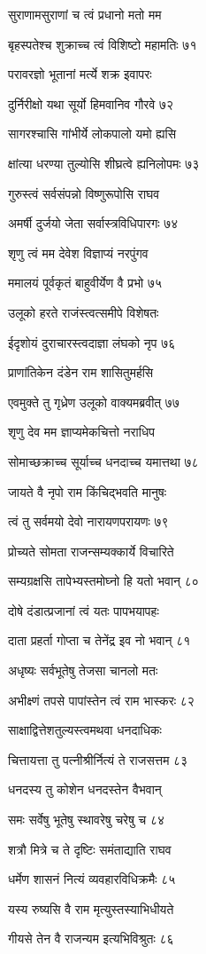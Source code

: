 सुराणामसुराणां च त्वं प्रधानो मतो मम

बृहस्पतेश्च शुक्राच्च त्वं विशिष्टो महामतिः ७१

परावरज्ञो भूतानां मर्त्ये शक्र इवापरः

दुर्निरीक्षो यथा सूर्यो हिमवानिव गौरवे ७२

सागरश्चासि गांभीर्ये लोकपालो यमो ह्यसि

क्षांत्या धरण्या तुल्योसि शीघ्रत्वे ह्यनिलोपमः ७३

गुरुस्त्वं सर्वसंपन्नो विष्णुरूपोसि राघव

अमर्षी दुर्जयो जेता सर्वास्त्रविधिपारगः ७४

शृणु त्वं मम देवेश विज्ञाप्यं नरपुंगव

ममालयं पूर्वकृतं बाहुवीर्येण वै प्रभो ७५

उलूको हरते राजंस्त्वत्समीपे विशेषतः

ईदृशोयं दुराचारस्त्वदाज्ञा लंघको नृप ७६

प्राणांतिकेन दंडेन राम शासितुमर्हसि

एवमुक्ते तु गृध्रेण उलूको वाक्यमब्रवीत् ७७

शृणु देव मम ज्ञाप्यमेकचित्तो नराधिप

सोमाच्छक्राच्च सूर्याच्च धनदाच्च यमात्तथा ७८

जायते वै नृपो राम किंचिद्भवति मानुषः

त्वं तु सर्वमयो देवो नारायणपरायणः ७९

प्रोच्यते सोमता राजन्सम्यक्कार्ये विचारिते

सम्यग्रक्षसि तापेभ्यस्तमोघ्नो हि यतो भवान् ८०

दोषे दंडात्प्रजानां त्वं यतः पापभयापहः

दाता प्रहर्ता गोप्ता च तेनेंद्र इव नो भवान् ८१

अधृष्यः सर्वभूतेषु तेजसा चानलो मतः

अभीक्ष्णं तपसे पापांस्तेन त्वं राम भास्करः ८२

साक्षाद्वित्तेशतुल्यस्त्वमथवा धनदाधिकः

चित्तायत्ता तु पत्नीश्रीर्नित्यं ते राजसत्तम ८३

धनदस्य तु कोशेन धनदस्तेन वैभवान्

समः सर्वेषु भूतेषु स्थावरेषु चरेषु च ८४

शत्रौ मित्रे च ते दृष्टिः समंताद्याति राघव

धर्मेण शासनं नित्यं व्यवहारविधिक्रमैः ८५

यस्य रुष्यसि वै राम मृत्युस्तस्याभिधीयते

गीयसे तेन वै राजन्यम इत्यभिविश्रुतः ८६

